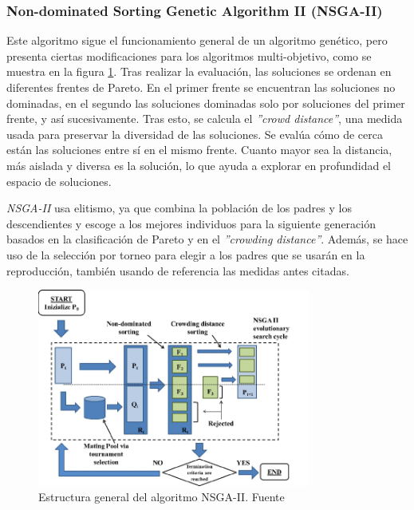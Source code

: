 \subsubsection{Non-dominated Sorting Genetic Algorithm II (NSGA-II)}
\label{ch:nsga2}

Este algoritmo sigue el funcionamiento general de un algoritmo genético, pero presenta ciertas modificaciones para los algoritmos multi-objetivo, como se muestra en la figura \ref{fig:nsga2}. Tras realizar la evaluación, las soluciones se ordenan en diferentes frentes de Pareto. En el primer frente se encuentran las soluciones no dominadas, en el segundo las soluciones dominadas solo por soluciones del primer frente, y así sucesivamente. Tras esto, se calcula el \textit{''crowd distance''}, una medida usada para preservar la diversidad de las soluciones. Se evalúa cómo de cerca están las soluciones entre sí en el mismo frente. Cuanto mayor sea la distancia, más aislada y diversa es la solución, lo que ayuda a explorar en profundidad el espacio de soluciones.

\textit{NSGA-II} usa elitismo, ya que combina la población de los padres y los descendientes y escoge a los mejores individuos para la siguiente generación basados en la clasificación de Pareto y en el \textit{''crowding distance''}. Además, se hace uso de la selección por torneo para elegir a los padres que se usarán en la reproducción, también usando de referencia las medidas antes citadas.~\cite{pymoo_nsga2}

\begin{figure}[H]
  \centering
  \includegraphics[width=0.8\textwidth]{figures/nsga2.png}
  \caption{Estructura general del algoritmo NSGA-II. Fuente \cite{nsga2_imagen}}
  \label{fig:nsga2}
\end{figure}

